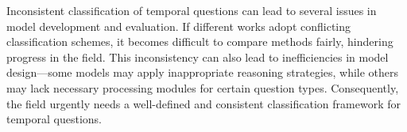 Inconsistent classification of temporal questions can lead to several issues in model development and evaluation. If different works adopt conflicting classification schemes, it becomes difficult to compare methods fairly, hindering progress in the field.  This inconsistency can also lead to inefficiencies in model design—some models may apply inappropriate reasoning strategies, while others may lack necessary processing modules for certain question types. Consequently, the field urgently needs a well-defined and consistent classification framework for temporal questions.

\IEEEpubidadjcol

